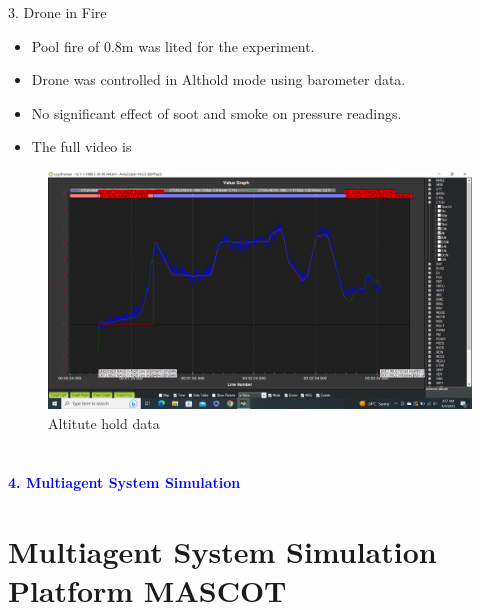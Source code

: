\documentclass[10pt]{beamer}
\begin{document}
\begin{frame}{}
    \begin{description}
        \item[3. Drone in Fire]
    \end{description}{}
    \begin{itemize}
        \item Pool fire of 0.8m was lited for the experiment.
        \item Drone was controlled in Althold mode using barometer data.
        \item No significant effect of soot and smoke on pressure readings.
        \item The full video is  
    \end{itemize}
    \begin{figure}[h!]
        \centering
        \includegraphics[scale=0.15]{uav_log.png} 
        \caption{Altitute hold data}
        \label{Fig:alt_data}
    \end{figure}

\end{frame}

\section*{}
\begin{frame}{}
    \huge{\centerline{\textcolor{blue}{\textbf{4. Multiagent System Simulation}}}}
\end{frame}
\section{Multiagent System Simulation Platform \textbf{MASCOT}}
\end{document}
